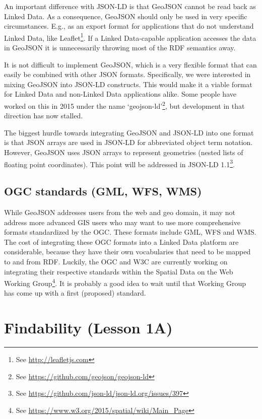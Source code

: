 \documentclass[a4paper]{scrartcl}
\newcommand{\seeUrl}[1]{\footnote{See \mbox{\url{#1}}}}
\begin{document}
An important difference with JSON-LD is that GeoJSON cannot be read
back as Linked Data.  As a consequence, GeoJSON should only be used in
very specific circumstances.  E.g., as an export format for
applications that do not understand Linked Data, like
Leaflet\seeUrl{http://leafletjs.com}.  If a Linked Data-capable
application accesses the data in GeoJSON it is unnecessarily throwing
most of the RDF semantics away.

It is not difficult to implement GeoJSON, which is a very flexible
format that can easily be combined with other JSON formats.
Specifically, we were interested in mixing GeoJSON into JSON-LD
constructs.  This would make it a viable format for Linked Data and
non-Linked Data applications alike.  Some people have worked on this
in 2015 under the name
`geojson-ld'\seeUrl{https://github.com/geojson/geojson-ld}, but
development in that direction has now stalled.

The biggest hurdle towards integrating GeoJSON and JSON-LD into one
format is that JSON arrays are used in JSON-LD for abbreviated object
term notation.  However, GeoJSON uses JSON arrays to represent
geometries (nested lists of floating point coordinates).  This point
will be addressed in JSON-LD
1.1\seeUrl{https://github.com/json-ld/json-ld.org/issues/397}.


\subsection{OGC standards (GML, WFS, WMS)}
\label{sec:ogc}

While GeoJSON addresses users from the web and geo domain, it may not
address more advanced GIS users who may want to use more comprehensive
formats standardized by the OGC.  These formats include GML, WFS and
WMS.  The cost of integrating these OGC formats into a Linked Data
platform are considerable, because they have their own vocabularies
that need to be mapped to and from RDF.  Luckily, the OGC and W3C are
currently working on integrating their respective standards within the
Spatial Data on the Web Working
Group\seeUrl{https://www.w3.org/2015/spatial/wiki/Main_Page}.  It is
probably a good idea to wait until that Working Group has come up with
a first (proposed) standard.


\section{Findability (Lesson 1A)}
\label{sec:findability}
\end{document}
